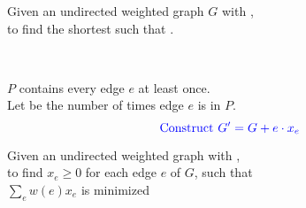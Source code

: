 \begin{frame}{}
  \begin{definition}
    \begin{center}
      Given an undirected weighted graph $G$ with , \\[5pt]
      to find the shortest  such that .
    \end{center}
  \end{definition}

  \pause
  \vspace{0.30cm}
  \begin{center}
  \end{center}

  \begin{columns}
  \end{columns}
\end{frame}

\begin{frame}{}
  \begin{center}
     \\[5pt] \pause
    $P$ contains every edge $e$ at least once. \\[5pt] \pause
    Let  be the number of times edge $e$ is in $P$. \pause
    \[
      \textcolor{blue}{\text{Construct } G' = G + e \cdot x_{e}}
    \]
    \pause
  \end{center}

  \pause
  \vspace{0.20cm}
  \begin{definition}
    Given an undirected weighted graph with , \\[5pt]
    to find $x_e \ge 0$ for each edge $e$ of $G$, such that \\
    $\sum_{e} w(e) x_e$ is minimized 
    
  \end{definition}
\end{frame}

\begin{frame}{}
  
\end{frame}

\begin{frame}{}
\end{frame}

\begin{frame}{}
\end{frame}

\begin{frame}{}
\end{frame}
